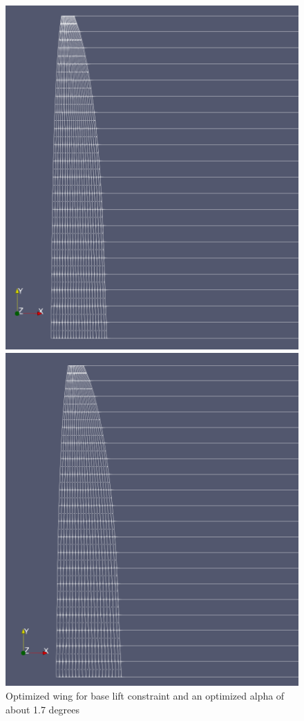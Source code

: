 \documentclass{article}
\begin{document}
\begin{figure}[h]
    \centering
\begin{minipage}[b]{0.45\textwidth}
\centering
\includegraphics[width=\textwidth]{1 scale optimized alpha.png}
\caption{Optimized wing for base lift constraint and an optimized alpha of about 1.7 degrees}
\label{fig:Optimized Alpha Small Load}
\end{minipage}
\begin{minipage}[b]{0.45\textwidth}
\centering
\includegraphics[width=\textwidth]{5 scale optimized alpha.png}

\end{minipage}
\end{figure}
\end{document}

